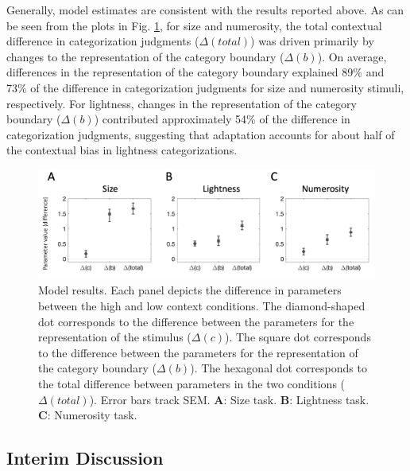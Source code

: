 \documentclass[a4paper, nobind]{templates/ociamthesis}
\begin{document}
Generally, model estimates are consistent with the results reported above. As can be seen from the plots in Fig. \ref{fig:cat-model}, for size and numerosity, the total contextual difference in categorization judgments (\(\Delta(total)\)) was driven primarily by changes to the representation of the category boundary (\(\Delta(b)\)). On average, differences in the representation of the category boundary explained 89\% and 73\% of the difference in categorization judgments for size and numerosity stimuli, respectively. For lightness, changes in the representation of the category boundary (\(\Delta(b)\)) contributed approximately 54\% of the difference in categorization judgments, suggesting that adaptation accounts for about half of the contextual bias in lightness categorizations.

\begin{figure}

{\centering \includegraphics[width=1\linewidth]{figures/cat-model} 

}

\caption[Experiment 2, Model results]{Model results. Each panel depicts the difference in parameters between the high and low context conditions. The diamond-shaped dot corresponds to the difference between the parameters for the representation of the stimulus ($\Delta(c)$). The square dot corresponds to the difference between the parameters for the representation of the category boundary ($\Delta(b)$). The hexagonal dot corresponds to the total difference between parameters in the two conditions ($\Delta(total)$). Error bars track SEM. $\textbf{A:}$ Size task. $\textbf{B:}$ Lightness task. $\textbf{C:}$ Numerosity task.}\label{fig:cat-model}
\end{figure}

\hypertarget{interim-discussion-5}{%
\subsection{Interim Discussion}\label{interim-discussion-5}}
\end{document}
